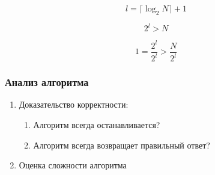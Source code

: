 \documentclass[24pt,pdf,hyperref={unicode},aspectratio=169]{beamer}
\begin{document}
\begin{frame}


\end{frame}

\begin{frame}

$$
l=\lceil \log_2 N \rceil+1
$$

$$
2^l>N
$$

$$
1=\frac{2^l}{2^l}>\frac{N}{2^l}
$$

\end{frame}

\begin{frame}\frametitle{Анализ алгоритма}

\begin{enumerate}
\item Доказательство корректности:
\begin{enumerate}
\item Алгоритм всегда останавливается?
\item Алгоритм всегда возвращает правильный ответ?
\end{enumerate}
\item Оценка сложности алгоритма
\end{enumerate}
\end{frame}
\end{document}
